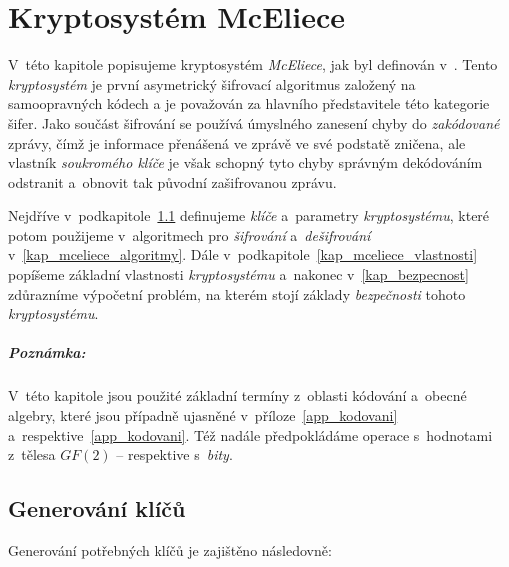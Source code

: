 \documentclass[thesis=M,czech,hidelinks]{FITthesis}[2012/06/26]
\newcommand{\0}{{\textcolor[gray]{0.75}{0}}}
\begin{document}
\chapter{Kryptosystém McEliece}\label{kap_mceliece}

V~této kapitole popisujeme kryptosystém \emph{McEliece}, jak byl definován
v~\cite{McEliece}.  Tento \emph{kryptosystém} je první asymetrický šifrovací
algoritmus založený na samoopravných kódech a je považován za hlavního
představitele této kategorie šifer. Jako součást šifrování se používá úmyslného
zanesení chyby do \emph{zakódované} zprávy, čímž je informace přenášená ve
zprávě ve své podstatě zničena, ale vlastník \emph{soukromého klíče} je však
schopný tyto chyby správným dekódováním odstranit a~obnovit tak původní
zašifrovanou zprávu.

Nejdříve v~podkapitole~\ref{kap_generovani_klicu} definujeme \emph{klíče}
a~parametry \emph{kryptosystému}, které potom použijeme v~algoritmech pro
\emph{šifrování} a~\emph{dešifrování} v~\ref{kap_mceliece_algoritmy}. Dále
v~podkapitole~\ref{kap_mceliece_vlastnosti} popíšeme základní vlastnosti
\emph{kryptosystému} a~nakonec v~\ref{kap_bezpecnost} zdůrazníme výpočetní
problém, na kterém stojí základy \emph{bezpečnosti} tohoto \emph{kryptosystému}.

\vfil


\paragraph{Poznámka:} V~této kapitole jsou použité základní termíny z~oblasti
kódování a~obecné algebry, které jsou případně ujasněné
v~příloze~\ref{app_kodovani} a~respektive~\ref{app_kodovani}. Též nadále
předpokládáme operace s~hodnotami z~tělesa $GF(2)$ -- respektive s~\emph{bity}.

\vfill


\section{Generování klíčů}\label{kap_generovani_klicu}

Generování potřebných klíčů je zajištěno následovně:
\end{document}
